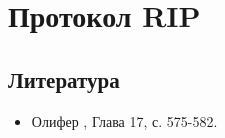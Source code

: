 \section{Протокол RIP}
\subsection{Литература}
\begin{itemize}
	\item Олифер \cite{olipher}, Глава 17, с. 575-582.
\end{itemize}